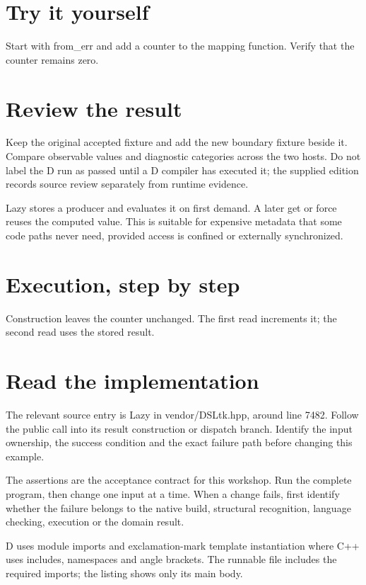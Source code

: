 \section*{Try it yourself}
Start with from\_err and add a counter to the mapping function. Verify that the counter remains zero.

\section*{Review the result}
Keep the original accepted fixture and add the new boundary fixture beside it. Compare observable values and diagnostic categories across the two hosts. Do not label the D run as passed until a D compiler has executed it; the supplied edition records source review separately from runtime evidence.

\clearpage
{}
Lazy stores a producer and evaluates it on first demand. A later get or force reuses the computed value. This is suitable for expensive metadata that some code paths never need, provided access is confined or externally synchronized.


\section*{Execution, step by step}
Construction leaves the counter unchanged. The first read increments it; the second read uses the stored result.

\section*{Read the implementation}
The relevant source entry is Lazy in vendor/DSLtk.hpp, around line 7482. Follow the public call into its result construction or dispatch branch. Identify the input ownership, the success condition and the exact failure path before changing this example.

The assertions are the acceptance contract for this workshop. Run the complete program, then change one input at a time. When a change fails, first identify whether the failure belongs to the native build, structural recognition, language checking, execution or the domain result.

\clearpage
{}
D uses module imports and exclamation-mark template instantiation where C++ uses includes, namespaces and angle brackets. The runnable file includes the required imports; the listing shows only its main body.

